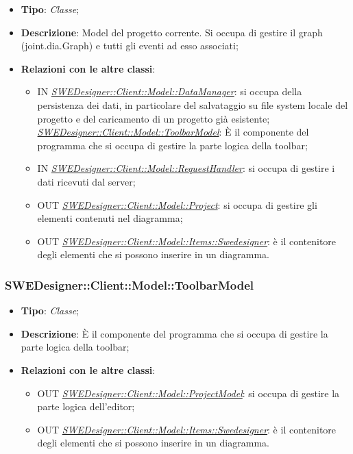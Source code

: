 \documentclass[../SpecificaTecnica.tex]{subfiles}
\begin{document}
					\begin{itemize}
						\item \textbf{Tipo}: \emph{Classe};
						\item \textbf{Descrizione}: Model del progetto corrente. Si occupa di gestire il graph (joint.dia.Graph) e tutti gli eventi ad esso associati;
						\item \textbf{Relazioni con le altre classi}:
						\begin{itemize}
							\item IN \hyperlink{SWEDesigner::Client::Model::DataManager}{\emph{SWEDesigner::Client::Model::DataManager}}: si occupa della persistenza dei dati, in particolare del salvataggio su file system locale del progetto e del caricamento di un progetto già esistente;
							\hyperlink{SWEDesigner::Client::Model::ToolbarModel}{\emph{SWEDesigner::Client::Model::ToolbarModel}}: È il componente del programma che si occupa di gestire la parte logica della toolbar;
							\item IN \hyperlink{SWEDesigner::Client::Model::RequestHandler}{\emph{SWEDesigner::Client::Model::RequestHandler}}: si occupa di gestire i dati ricevuti dal server;
							\item OUT \hyperlink{SWEDesigner::Client::Model::Project}{\emph{SWEDesigner::Client::Model::Project}}: si occupa di gestire gli elementi contenuti nel diagramma;
							\item OUT \hyperlink{SWEDesigner::Client::Model::Items::Swedesigner}{\emph{SWEDesigner::Client::Model::Items::Swedesigner}}: è il contenitore degli elementi che si possono inserire in un diagramma.
						\end{itemize}
					\end{itemize}

				\subsubsection{SWEDesigner::Client::Model::ToolbarModel}
				\hypertarget{SWEDesigner::Client::Model::ToolbarModel}{}
					\begin{itemize}
						\item \textbf{Tipo}: \emph{Classe};
						\item \textbf{Descrizione}: È il componente del programma che si occupa di gestire la parte logica della toolbar;
						\item \textbf{Relazioni con le altre classi}:
						\begin{itemize}
							\item OUT \hyperlink{SWEDesigner::Client::Model::ProjectModel}{\emph{SWEDesigner::Client::Model::ProjectModel}}: si occupa di gestire la parte logica dell'editor;
							\item OUT \hyperlink{SWEDesigner::Client::Model::Items::Swedesigner}{\emph{SWEDesigner::Client::Model::Items::Swedesigner}}: è il contenitore degli elementi che si possono inserire in un diagramma.
						\end{itemize}
					\end{itemize}
\end{document}
